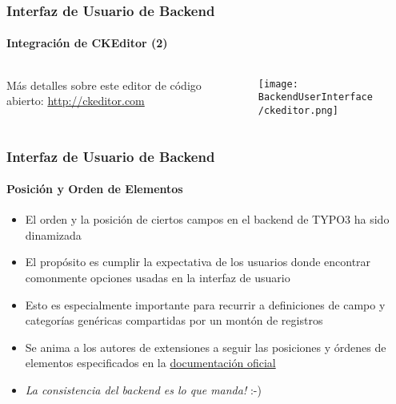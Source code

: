 \begin{frame}[fragile]
	\frametitle{Interfaz de Usuario de Backend}
	\framesubtitle{Integración de CKEditor (2)}

	\begin{columns}[T]
		\begin{column}{.5\textwidth}
			Más detalles sobre este editor de código abierto: \url{http://ckeditor.com}
		\end{column}
		\begin{column}{.5\textwidth}
			\begin{figure}\vspace*{-0.4cm}
				\texttt{[image: BackendUserInterface/ckeditor.png]}
			\end{figure}
		\end{column}
	\end{columns}

\end{frame}


\begin{frame}[fragile]
	\frametitle{Interfaz de Usuario de Backend}
	\framesubtitle{Posición y Orden de Elementos}

	\begin{itemize}
		\item El orden y la posición de ciertos campos en el backend de TYPO3 ha sido dinamizada
		\item El propósito es cumplir la expectativa de los usuarios donde encontrar comonmente opciones usadas en la interfaz de usuario
		\item Esto es especialmente importante para recurrir a definiciones de campo y categorías genéricas compartidas por un montón de registros
		\item Se anima a los autores de extensiones a seguir las posiciones y órdenes de elementos especificados en
			la \href{https://docs.typo3.org}{documentación oficial}


	\end{itemize}

	\begin{itemize}
		\item \textit{La consistencia del backend es lo que manda!} :-)
	\end{itemize}

\end{frame}

